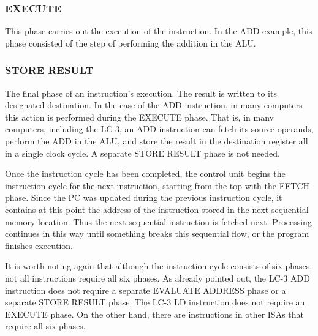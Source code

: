 \documentclass{patt}
\begin{document}
\subsubsection{EXECUTE}
This phase carries out the execution of the instruction.  In the ADD
example, this phase consisted of the step of performing the
addition in the ALU.

\subsubsection{STORE RESULT}
The final phase of an instruction's execution.  The result is written
to its designated destination.  In the case of the ADD instruction, in many 
computers this action is performed during the EXECUTE phase.  That is,
in many computers, including the LC-3, an ADD instruction can fetch its
source operands, perform the ADD in the ALU, and store the result in the
destination register all in a single clock cycle.  A separate STORE RESULT
phase is not needed.

\bigskip

Once the instruction cycle has been completed, the control unit begins the 
instruction cycle for the next instruction, starting from the top with the
FETCH phase.  Since the PC was updated during the previous instruction
cycle, it contains at this point the address of the instruction stored
in the next sequential memory location.  Thus the next sequential
instruction is fetched next. Processing continues in this way until
something breaks this sequential flow, or the program finishes execution.

It is worth noting again that although the instruction cycle consists of 
six phases, not all instructions require all six phases.  As already pointed 
out, the LC-3 ADD instruction does not require a separate EVALUATE ADDRESS
phase or a separate STORE RESULT phase.  The LC-3 LD instruction does not 
require an EXECUTE phase.  On the other hand, there are instructions in other
ISAs that require all six phases.

\bigskip

\begingroup
\makeatletter
\renewenvironment{example}{%
  \refstepcounter{example}%
  \begin{colourframed}%
    \def\@mathmargin{\z@}
    \let\enumargs\exenumargs
    \vspace*{-2\p@}%
    \rlap{\hspace*{29pc}\hbox{\hspace*{-\fboxsep}%
      \setlength{\fboxsep}{\z@}%
      {\colorbox{SPOThundred}{\vbox to 13\p@{%
          \vss\hbox to 7pc{\hss
          \color{white}\sansbold\fontsize{10}{12}\selectfont
          Example~\theexample\hss}\vss}}}}}%
  \normalfont\fontsize{9.5}{11}\selectfont
  \rightskip7.5pc\advance\rightskip by \fboxsep
  \leftskip3\p@
  \parindent1.5pc\@afterheading\@afterindentfalse
  \vspace*{-14.5\p@}}%
{\par\unskip\removelastskip\offinterlineskip\vspace{4\p@}\end{colourframed}}
\makeatother
\end{document}
